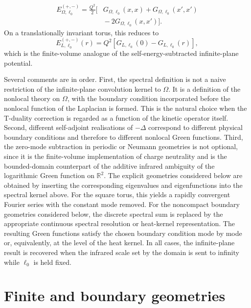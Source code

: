 \documentclass[nopacs,amsmath,amsfonts,amssymb,aps,superscriptaddress]{revtex4}
\begin{document}
\begin{equation}
\begin{split}
  E_{\Omega,\ell_0}^{(+,-)}=\frac{Q^2}{2}\big[&
  G_{\Omega,\ell_0}(x,x)+G_{\Omega,\ell_0}(x',x')\\
  &{}-2G_{\Omega,\ell_0}(x,x')\big].
\end{split}
\end{equation}
On a translationally invariant torus, this reduces to
\begin{equation}
  E_{L,\ell_0}^{(+,-)}(r)=
  Q^2\left[G_{L,\ell_0}(0)-G_{L,\ell_0}(r)\right],
\end{equation}
which is the finite-volume analogue of the self-energy-subtracted infinite-plane potential.

Several comments are in order. First, the spectral definition is not a naive restriction of the infinite-plane convolution kernel to $\Omega$. It is a definition of the nonlocal theory on $\Omega$, with the boundary condition incorporated before the nonlocal function of the Laplacian is formed. This is the natural choice when the T-duality correction is regarded as a function of the kinetic operator itself. Second, different self-adjoint realisations of $-\Delta$ correspond to different physical boundary conditions and therefore to different nonlocal Green functions. Third, the zero-mode subtraction in periodic or Neumann geometries is not optional, since it is the finite-volume implementation of charge neutrality and is the bounded-domain counterpart of the additive infrared ambiguity of the logarithmic Green function on $\mathbb R^2$. The explicit geometries considered below are obtained by inserting the corresponding eigenvalues and eigenfunctions into the spectral kernel above. For the square torus, this yields a rapidly convergent Fourier series with the constant mode removed. For the noncompact boundary geometries considered below, the discrete spectral sum is replaced by the appropriate continuous spectral resolution or heat-kernel representation. The resulting Green functions satisfy the chosen boundary condition mode by mode or, equivalently, at the level of the heat kernel. In all cases, the infinite-plane result is recovered when the infrared scale set by the domain is sent to infinity while $\ell_0$ is held fixed.


\section{Finite and boundary geometries}\label{sec:finite_boundary_examples}
\end{document}

